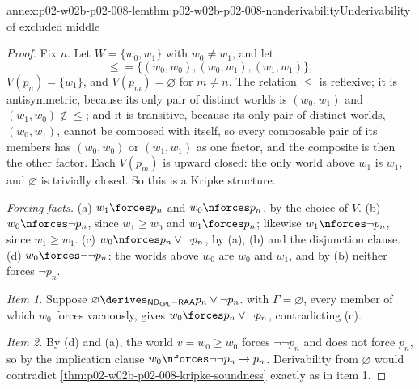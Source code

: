 \begin{annexitem}{annex:p02-w02b-p02-008-lem}{thm:p02-w02b-p02-008-nonderivability}{Underivability of excluded middle}
\begin{proof}
Fix \(n\).  Let \(W=\{w_0,w_1\}\) with \(w_0\neq w_1\), and let
\[
  {\leq}=\{(w_0,w_0),(w_0,w_1),(w_1,w_1)\},
\]
\(V(p_n)=\{w_1\}\), and \(V(p_m)=\varnothing\) for \(m\neq n\).  The relation \(\leq\) is reflexive;
it is antisymmetric, because its only pair of distinct worlds is
\((w_0,w_1)\) and \((w_1,w_0)\notin{\leq}\); and it is transitive, because
its only pair of distinct worlds, \((w_0,w_1)\), cannot be composed with
itself, so every composable pair of its members has \((w_0,w_0)\) or
\((w_1,w_1)\) as one factor, and the composite is then the other factor.  Each \(V(p_m)\) is upward closed: the only world above \(w_1\)
is \(w_1\), and \(\varnothing\) is trivially closed.  So this is a Kripke
structure.

\emph{Forcing facts.}  (a) \(w_1\forces p_n\) and \(w_0\nforces p_n\), by the
choice of \(V\).  (b) \(w_0\nforces\neg p_n\), since \(w_1\geq w_0\) and
\(w_1\forces p_n\); likewise \(w_1\nforces\neg p_n\), since \(w_1\geq w_1\).
(c) \(w_0\nforces p_n\lor\neg p_n\), by (a), (b) and the disjunction clause.
(d) \(w_0\forces\neg\neg p_n\): the worlds above \(w_0\) are \(w_0\) and
\(w_1\), and by (b) neither forces \(\neg p_n\).

\emph{Item 1.}  Suppose
\(\varnothing\derives_{\mathsf{ND}_{\mathsf{CPL}}-\mathsf{RAA}}p_n\lor\neg p_n\).
 with \(\Gamma=\varnothing\),
every member of which \(w_0\) forces vacuously, gives
\(w_0\forces p_n\lor\neg p_n\), contradicting (c).

\emph{Item 2.}  By (d) and (a), the world \(v=w_0\geq w_0\) forces
\(\neg\neg p_n\) and does not force \(p_n\), so by the implication clause
\(w_0\nforces\neg\neg p_n\to p_n\).  Derivability from \(\varnothing\) would
contradict \cref{thm:p02-w02b-p02-008-kripke-soundness} exactly as in item 1.


\end{proof}
\end{annexitem}
